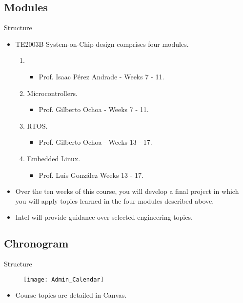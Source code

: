 \documentclass[]{slides}
\begin{document}
\subsection{Modules}
\begin{frame}{Structure}
\begin{itemize}
  \item TE2003B System-on-Chip design comprises four modules.
  \begin{enumerate}
    \item {}
      \begin{itemize}
        \item Prof. Isaac P\'erez Andrade - Weeks 7 - 11.
      \end{itemize}
    \item Microcontrollers.
      \begin{itemize}
        \item Prof. Gilberto Ochoa - Weeks 7 - 11.
      \end{itemize}
    \item \ac{RTOS}.
      \begin{itemize}
        \item Prof. Gilberto Ochoa - Weeks 13 - 17.
      \end{itemize}
    \item Embedded Linux.
      \begin{itemize}
        \item Prof. Luis Gonz\'alez Weeks 13 - 17.
      \end{itemize}
  \end{enumerate}
  \item Over the ten weeks of this course, you will develop a final project in which you will apply topics learned in the four modules described above.
  \item Intel will provide guidance over selected engineering topics.
\end{itemize}
\end{frame}

\subsection{Chronogram}
\begin{frame}{Structure}
\begin{figure}
\texttt{[image: Admin\_Calendar]}
\end{figure}
\vspace{-15pt}
\begin{itemize}
  \item Course topics are detailed in Canvas. 
\end{itemize}
\end{frame}
\end{document}
